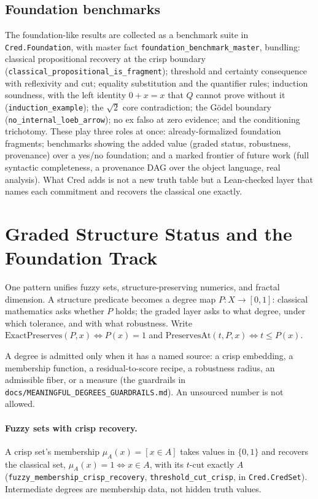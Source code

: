 \documentclass[11pt,a4paper]{article}
\newcommand{\Lean}[1]{\texttt{#1}}
\begin{document}
\subsection{Foundation benchmarks}
The foundation-like results are collected as a benchmark suite in
\texttt{Cred.Foundation}, with master fact
\Lean{foundation\_benchmark\_master}, bundling: classical propositional
recovery at the crisp boundary
(\Lean{classical\_propositional\_is\_fragment}); threshold and certainty
consequence with reflexivity and cut; equality substitution and the
quantifier rules; induction soundness, with the left identity $0+x=x$ that
$Q$ cannot prove without it (\Lean{induction\_example}); the $\sqrt2$ core
contradiction; the G\"odel boundary (\Lean{no\_internal\_loeb\_arrow}); no
ex falso at zero evidence; and the conditioning trichotomy.  These play
three roles at once: already-formalized foundation fragments; benchmarks
showing the added value (graded status, robustness, provenance) over a
yes/no foundation; and a marked frontier of future work (full syntactic
completeness, a provenance DAG over the object language, real analysis).
What Cred adds is not a new truth table but a Lean-checked layer that names
each commitment and recovers the classical one exactly.

\section{Graded Structure Status and the Foundation Track}
\label{sec:graded-structure}

One pattern unifies fuzzy sets, structure-preserving numerics, and
fractal dimension.  A structure predicate becomes a degree map
$P:X\to[0,1]$: classical mathematics asks whether $P$ holds; the graded
layer asks to what degree, under which tolerance, and with what
robustness.  Write $\mathrm{ExactPreserves}(P,x)\iff P(x)=1$ and
$\mathrm{PreservesAt}(t,P,x)\iff t\le P(x)$.

A degree is admitted only when it has a named source: a crisp embedding,
a membership function, a residual-to-score recipe, a robustness radius,
an admissible fiber, or a measure (the guardrails in
\texttt{docs/MEANINGFUL\_DEGREES\_GUARDRAILS.md}).  An unsourced number is
not allowed.

\paragraph{Fuzzy sets with crisp recovery.}
A crisp set's membership $\mu_A(x)=[x\in A]$ takes values in $\{0,1\}$
and recovers the classical set, $\mu_A(x)=1\iff x\in A$, with its
$t$-cut exactly $A$ (\Lean{fuzzy\_membership\_crisp\_recovery},
\Lean{threshold\_cut\_crisp}, in \texttt{Cred.CredSet}).  Intermediate
degrees are membership data, not hidden truth values.
\end{document}
